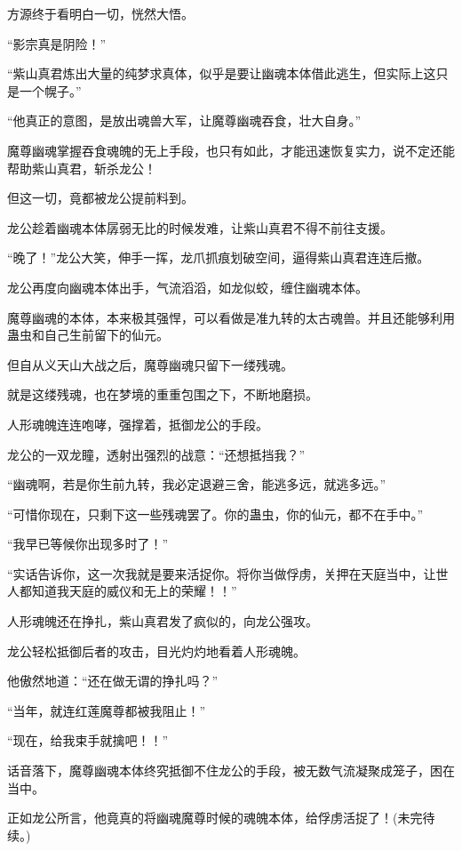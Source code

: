 \begin{this_body}
方源终于看明白一切，恍然大悟。

“影宗真是阴险！”

“紫山真君炼出大量的纯梦求真体，似乎是要让幽魂本体借此逃生，但实际上这只是一个幌子。”

“他真正的意图，是放出魂兽大军，让魔尊幽魂吞食，壮大自身。”

魔尊幽魂掌握吞食魂魄的无上手段，也只有如此，才能迅速恢复实力，说不定还能帮助紫山真君，斩杀龙公！

但这一切，竟都被龙公提前料到。

龙公趁着幽魂本体孱弱无比的时候发难，让紫山真君不得不前往支援。

“晚了！”龙公大笑，伸手一挥，龙爪抓痕划破空间，逼得紫山真君连连后撤。

龙公再度向幽魂本体出手，气流滔滔，如龙似蛟，缠住幽魂本体。

魔尊幽魂的本体，本来极其强悍，可以看做是准九转的太古魂兽。并且还能够利用蛊虫和自己生前留下的仙元。

但自从义天山大战之后，魔尊幽魂只留下一缕残魂。

就是这缕残魂，也在梦境的重重包围之下，不断地磨损。

人形魂魄连连咆哮，强撑着，抵御龙公的手段。

龙公的一双龙瞳，透射出强烈的战意：“还想抵挡我？”

“幽魂啊，若是你生前九转，我必定退避三舍，能逃多远，就逃多远。”

“可惜你现在，只剩下这一些残魂罢了。你的蛊虫，你的仙元，都不在手中。”

“我早已等候你出现多时了！”

“实话告诉你，这一次我就是要来活捉你。将你当做俘虏，关押在天庭当中，让世人都知道我天庭的威仪和无上的荣耀！！”

人形魂魄还在挣扎，紫山真君发了疯似的，向龙公强攻。

龙公轻松抵御后者的攻击，目光灼灼地看着人形魂魄。

他傲然地道：“还在做无谓的挣扎吗？”

“当年，就连红莲魔尊都被我阻止！”

“现在，给我束手就擒吧！！”

话音落下，魔尊幽魂本体终究抵御不住龙公的手段，被无数气流凝聚成笼子，困在当中。

正如龙公所言，他竟真的将幽魂魔尊时候的魂魄本体，给俘虏活捉了！(未完待续。)

\end{this_body}

